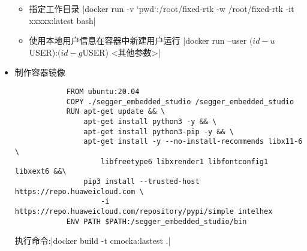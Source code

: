 \begin{itemize}
\begin{itemize}
        \item 指定工作目录
        |docker run -v `pwd`:/root/fixed-rtk -w /root/fixed-rtk -it xxxxx:latest bash|
        \item 使用本地用户信息在容器中新建用户运行
        |docker run --user $(id -u ${USER}):$(id -g ${USER})  <其他参数>|
    \end{itemize}
    \item 制作容器镜像
        \begin{verbatim}
            FROM ubuntu:20.04
            COPY ./segger_embedded_studio /segger_embedded_studio
            RUN apt-get update && \
                apt-get install python3 -y && \
                apt-get install python3-pip -y && \
                apt-get install -y --no-install-recommends libx11-6 \
                    libfreetype6 libxrender1 libfontconfig1 libxext6 &&\
                pip3 install --trusted-host https://repo.huaweicloud.com \
                    -i https://repo.huaweicloud.com/repository/pypi/simple intelhex
            ENV PATH $PATH:/segger_embedded_studio/bin
        \end{verbatim}
        执行命令:\mint{bash}|docker build -t cmocka:lastest .|
\end{itemize}